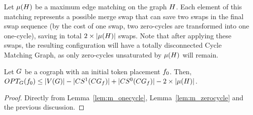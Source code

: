 \documentclass[msc,english,table,xcdraw]{ppgccufmg}
\begin{document}

Let $\mu(H)$ be a maximum edge matching on the graph 
$H$.
Each element of this matching represents a possible merge swap that can save two 
swaps in the final swap sequence (by the cost of one swap, two zero-cycles are transformed into one one-cycle), saving in total $2\times|\mu(H)|$ swaps.
Note that after applying these swaps, the resulting configuration will have a
totally disconnected Cycle Matching Graph, as only zero-cycles unsaturated by  $\mu(H)$ will remain.



\begin{lemma}
\label{lem:ub_cograph}
Let $G$ be a cograph with an initial token placement $f_{0}$.
Then, $OPT_{G}(f_{0}) \leq |V(G)| - 
|CS^{1}(CG_{f})| +
|CS^{0}(CG_{f})| - 2\times|\mu(H)|$.
\end{lemma}

\begin{proof}
Directly from Lemma~\ref{lem:m_onecycle}, Lemma~\ref{lem:m_zerocycle} and the previous discussion.
\end{proof}
\end{document}
